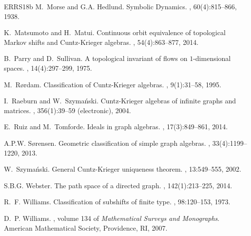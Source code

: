\documentclass[12pt]{amsbook}%
\theoremstyle{defin}
\theoremstyle{remark}
\numberwithin{equation}{chapter}
\numberwithin{theor}{section}
\begin{document}
\begin{thebibliography}{ERRS18b}
M.~Morse and G.A. Hedlund.
\newblock Symbolic {D}ynamics.
, 60(4):815--866, 1938.

K.~Matsumoto and H.~Matui.
\newblock Continuous orbit equivalence of topological {M}arkov shifts and
  {C}untz-{K}rieger algebras.
, 54(4):863--877, 2014.

B.~Parry and D.~Sullivan.
\newblock A topological invariant of flows on {$1$}-dimensional spaces.
, 14(4):297--299, 1975.

M.~R{\o}rdam.
\newblock Classification of {C}untz-{K}rieger algebras.
, 9(1):31--58, 1995.

I.~Raeburn and W.~Szyma{\'n}ski.
\newblock Cuntz-{K}rieger algebras of infinite graphs and matrices.
, 356(1):39--59 (electronic), 2004.

E.~Ruiz and M.~Tomforde.
\newblock Ideals in graph algebras.
, 17(3):849--861, 2014.

A.P.W. S{\o}rensen.
\newblock Geometric classification of simple graph algebras.
, 33(4):1199--1220, 2013.

W.~Szyma\'nski.
\newblock General {Cuntz-Krieger} uniqueness theorem.
, 13:549--555, 2002.

S.B.G. Webster.
\newblock The path space of a directed graph.
, 142(1):213--225, 2014.

R.~F. Williams.
\newblock Classification of subshifts of finite type.
, 98:120--153, 1973.

D.~P. Williams.
, volume 134 of {\em
  Mathematical Surveys and Monographs}.
\newblock American Mathematical Society, Providence, RI, 2007.

\end{thebibliography}
\end{document}
